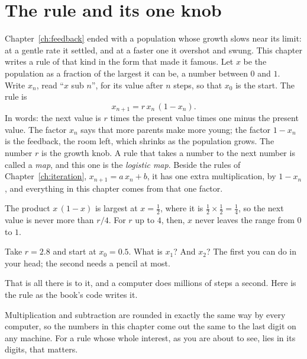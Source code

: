 \section{The rule and its one knob}
\label{sec:ch05-rule}

\noindent
Chapter~\ref{ch:feedback} ended with a population whose growth slows near
its limit: at a gentle rate it settled, and at a faster one it overshot and
swung. This chapter writes a rule of that kind in the form that made it
famous. Let $x$ be the population as a fraction of the largest it can be, a
number between $0$ and $1$. Write $x_n$, read \enquote{$x$ sub $n$}, for its
value after $n$ steps, so that $x_0$ is the start. The rule is
\[ x_{n+1} = r\, x_n\, (1 - x_n). \]
In words: the next value is $r$ times the present value times one minus the
present value. The factor $x_n$ says that more parents make more young; the
factor $1 - x_n$ is the feedback, the room left, which shrinks as the
population grows. The number $r$ is the growth knob. A rule that takes a
number to the next number is called a \emph{map}, and this one is the
\emph{logistic map}. Beside the rules of Chapter~\ref{ch:iteration},
$x_{n+1} = a\,x_n + b$, it has one extra multiplication, by $1 - x_n$, and
everything in this chapter comes from that one factor.

The product $x\,(1 - x)$ is largest at $x = \tfrac12$, where it is
$\tfrac12 \times \tfrac12 = \tfrac14$, so the next value is never more than
$r/4$. For $r$ up to $4$, then, $x$ never leaves the range from $0$ to $1$.

\begin{think}
Take $r = \num{2.8}$ and start at $x_0 = \num{0.5}$. What is $x_1$? And
$x_2$? The first you can do in your head; the second needs a pencil at most.
\end{think}

\noindent
That is all there is to it, and a computer does millions of steps a second.
Here is the rule as the book's code writes it.


\noindent
Multiplication and subtraction are rounded in exactly the same way by every
computer, so the numbers in this chapter come out the same to the last digit
on any machine. For a rule whose whole interest, as you are about to see,
lies in its digits, that matters.

